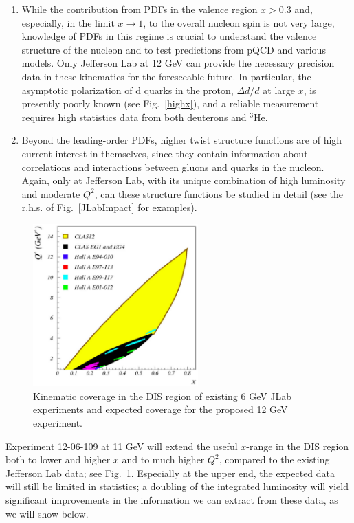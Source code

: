 \begin{enumerate}
\item While the contribution from PDFs in the valence region $x > 0.3$ and, especially, in the limit $x \rightarrow 1$, to the overall
nucleon spin is not very large, knowledge of PDFs in this regime is crucial to understand the valence structure of the nucleon and to
test predictions from pQCD and various models. Only Jefferson Lab at 12 GeV can provide the necessary precision data
in these kinematics for the foreseeable future. In particular, the asymptotic polarization of d quarks in the proton,
$\Delta d/ d$ at large $x$, is presently poorly known (see Fig.~\ref{highx}), 
and a reliable measurement requires high statistics data from both
deuterons and $^3$He.

\item Beyond the leading-order PDFs, higher twist structure functions are of high current interest in themselves, since
they contain information about correlations and interactions between gluons and quarks in the nucleon. Again, only at Jefferson Lab, with its unique combination of high luminosity
and moderate $Q^2$, can these structure functions be studied in detail (see
the r.h.s. of  Fig.~\ref{JLabImpact} for
examples).
\end{enumerate}

\begin{figure}[hbt!]
\begin{center}
\includegraphics[width=2.5in]{dis/Coverage2-eps-converted-to.pdf}
\end{center}
\caption{\baselineskip 13pt \small
Kinematic coverage in the DIS region
 of existing 6 GeV JLab experiments and expected coverage
for the proposed 12 GeV experiment.}
\label{coverage}
\end{figure}

Experiment 12-06-109 at 11 GeV will 
 extend the useful $x$-range in the DIS region both to lower and
higher $x$ and to much higher $Q^2$, compared to the existing Jefferson Lab data; see Fig.~\ref{coverage}.
Especially at the upper end, the expected data will still be limited in statistics; a doubling of the
integrated luminosity will yield significant improvements in the information we can extract from these data,
as we will show below.

